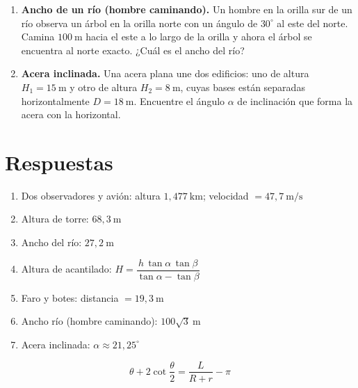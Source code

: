 \documentclass[12pt,a4paper]{article}
\begin{document}
\begin{tcolorbox}[ejercbox,
  title={\color{dorado}\bfseries Problemas propuestos}]
\begin{enumerate}[leftmargin=*, itemsep=10pt]
  \item \textbf{Ancho de un río (hombre caminando).}
  Un hombre en la orilla sur de un río observa un árbol en la orilla norte
  con un ángulo de $30^\circ$ al este del norte. Camina $100\ \text{m}$ hacia
  el este a lo largo de la orilla y ahora el árbol se encuentra al norte exacto.
  ¿Cuál es el ancho del río?

  \item \textbf{Acera inclinada.}
  Una acera plana une dos edificios: uno de altura $H_1 = 15\ \text{m}$
  y otro de altura $H_2 = 8\ \text{m}$, cuyas bases están separadas
  horizontalmente $D = 18\ \text{m}$.
  Encuentre el ángulo $\alpha$ de inclinación que forma la acera con
  la horizontal.

\end{enumerate}
\end{tcolorbox}

\section{Respuestas}

\begin{tcolorbox}[ejercbox,
  title={\color{dorado}\bfseries Respuestas}]
\begin{enumerate}[leftmargin=*, itemsep=6pt]
  \item Dos observadores y avión:\quad
        altura $1{,}477\ \text{km}$;\quad
        velocidad $= 47{,}7\ \text{m/s}$
  \item Altura de torre: $68{,}3\ \text{m}$
  \item Ancho del río: $27{,}2\ \text{m}$
  \item Altura de acantilado: $H = \dfrac{h\,\tan\alpha\,\tan\beta}{\tan\alpha - \tan\beta}$
  \item Faro y botes: distancia $= 19{,}3\ \text{m}$
  \item Ancho río (hombre caminando): $100\sqrt{3}\ \text{m}$
  \item Acera inclinada: $\alpha \approx 21{,}25^\circ$
\end{enumerate}
\end{tcolorbox}

\vspace{0.8cm}

\begin{tcolorbox}[formulabox, title={Ejercicio avanzado --- Bandas y poleas}]
\[
  \theta + 2\cot\frac{\theta}{2} = \frac{L}{R+r} - \pi
\]
\end{tcolorbox}
\end{document}
